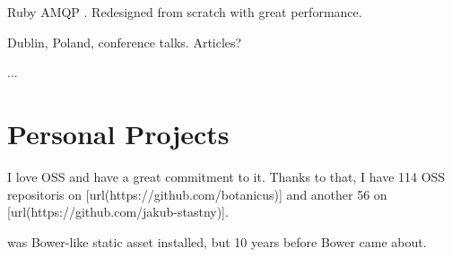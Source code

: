 \startitemize
  \item Ruby AMQP . Redesigned from scratch with great performance.
  \item Dublin, Poland, conference talks. Articles?
  \item ...
\stopitemize

\blank \section{Personal Projects}
I love OSS and have a great commitment to it.
Thanks to that, I have 114 OSS repositoris on [url(https://github.com/botanicus)] and another 56 on [url(https://github.com/jakub-stastny)].


\startitemize

  \item \from[pupu] was Bower-like static asset installed, but 10 years before Bower came about.

  \item \from[dpm]
  \item \from[et]
\stopitemize
